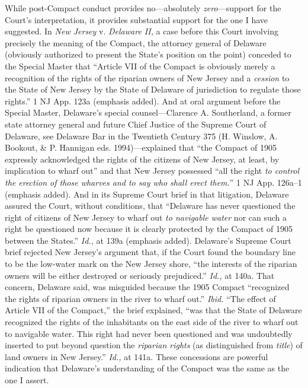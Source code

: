 {  While post-Compact conduct provides no---absolutely \emph{zero}---support
for the Court's interpretation, it provides substantial support for
the one I have suggested. In \emph{New Jersey} v. \emph{Delaware II,} a case
before this Court involving precisely the meaning of the Compact, the
attorney general of \newpage  Delaware (obviously authorized to present
the State's position on the point) conceded to the Special Master
that ``Article VII of the Compact is obviously merely a recognition
of the rights of the riparian owners of New Jersey and a \emph{cession}
to the State of New Jersey by the State of Delaware of jurisdiction
to regulate those rights.'' 1 NJ App. 123a (emphasis added).
And at oral argument before the Special Master, Delaware's special
counsel---Clarence A. Southerland, a former state attorney general
and future Chief Justice of the Supreme Court of Delaware, see
Delaware Bar in the Twentieth Century 375 (H. Winslow, A. Bookout, \& P.
Hannigan eds. 1994)---explained that ``the Compact of 1905 expressly
acknowledged the rights of the citizens of New Jersey, at least, by
implication to wharf out'' and that New Jersey possessed ``all the
right \emph{to control the erection of those wharves and to say who shall
erect them.}'' 1 NJ App. 126a--1 (emphasis added). And in its
Supreme Court brief in that litigation, Delaware assured the Court,
without conditions, that ``Delaware has never questioned the right of
citizens of New Jersey to wharf out \emph{to navigable water} nor can such
a right be questioned now because it is clearly protected by the Compact
of 1905 between the States.'' \emph{Id.,} at 139a (emphasis added).
Delaware's Supreme Court brief rejected New Jersey's argument
that, if the Court found the boundary line to be the low-water mark
on the New Jersey shore, ``the interests of the riparian owners will
be either destroyed or seriously prejudiced.'' \emph{Id.,} at 140a.
That concern, Delaware said, was misguided because the 1905 Compact
``recognized the rights of riparian owners in the river to wharf
out.'' \emph{Ibid.} ``The effect of Article VII of the Compact,''
the brief explained, ``was that the State of Delaware recognized
the rights of the inhabitants on the east side of the river to wharf
out to navigable water. This right had never been questioned and was
undoubtedly inserted to put beyond question the \emph{riparian rights}
(as distinguished from \emph{title}) of land owners in New Jersey.''
\emph{Id.,} at 141a. These concessions are \newpage  powerful indication that
Delaware's understanding of the Compact was the same as the one I
assert.

}
